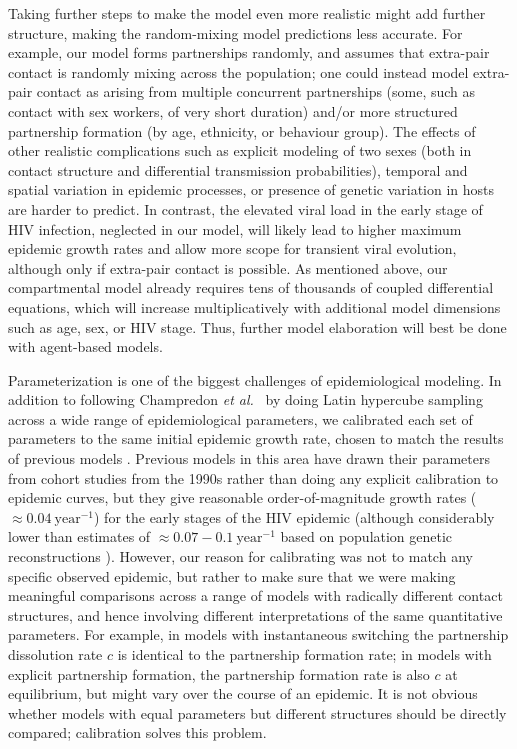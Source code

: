 \documentclass[10pt,letterpaper]{article}
\newcommand{\etal}{\textit{et al.}}
\begin{document}
Taking further steps to make the model even more realistic might add
further structure, making the random-mixing model predictions less
accurate. For example, our model forms partnerships randomly, and
assumes that extra-pair contact is randomly mixing across the
population; one could instead model extra-pair contact as arising from
multiple concurrent partnerships (some, such as contact with sex
workers, of very short duration) and/or more structured partnership
formation (by age, ethnicity, or behaviour group). The effects of
other realistic complications such as explicit modeling of two sexes
(both in contact structure and differential transmission
probabilities), temporal and spatial variation in epidemic processes,
or presence of genetic variation in hosts are harder to predict.
In contrast, the elevated viral load in the early stage of HIV infection,
neglected in our model, will likely lead to higher maximum
epidemic growth rates and allow more scope for transient viral
evolution, although only if extra-pair contact is possible.
As mentioned above, our compartmental model already requires tens
of thousands of coupled differential equations, which will increase
multiplicatively with additional model dimensions such as age,
sex, or HIV stage. Thus, further model elaboration will best be 
done with agent-based models.

Parameterization is one of the biggest challenges of epidemiological
modeling. In addition to following Champredon \etal\ \cite{champredon_hiv_2013} 
by doing Latin hypercube
sampling across a wide range of epidemiological parameters, we 
calibrated each set of parameters to the same initial epidemic
growth rate, chosen to match the results of previous models
\cite{shirreff_transmission_2011}.  Previous models 
in this area have drawn their
parameters from cohort studies from the 1990s
\cite{wawer2005rates,hollingsworth_hiv1_2008}
rather than doing any explicit calibration to epidemic curves,
but they give reasonable order-of-magnitude
growth rates ($\approx 0.04~\textrm{year}^{-1}$)
for the early stages of the HIV epidemic (although considerably
lower than estimates of $\approx 0.07-0.1~\textrm{year}^{-1}$
based on population genetic reconstructions \cite{faria_early_2014}).
However, our reason for calibrating was not to match any
specific observed epidemic, but rather to make sure that
we were making meaningful comparisons across a range of
models with radically different contact structures, and
hence involving different interpretations of the same quantitative
parameters.  For example, in models with instantaneous switching the
partnership dissolution rate $c$ is identical to the partnership
formation rate; in models with explicit partnership formation,
the partnership formation rate is also $c$ at equilibrium,
but might vary over the course of an epidemic.
It is not obvious whether models with equal parameters but
different structures should be directly compared; calibration
solves this problem.
\end{document}
